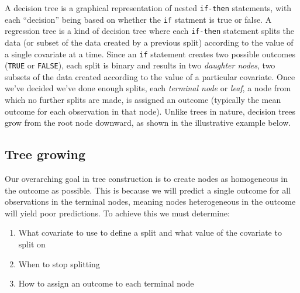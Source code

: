 \documentclass[12pt]{article}
\begin{document}
A decision tree is a graphical representation of nested \texttt{if-then} statements, with each ``decision'' being based on whether the \texttt{if} statment is true or false. A regression tree is a kind of decision tree where each \texttt{if-then} statement splits the data (or subset of the data created by a previous split) according to the value of a single covariate at a time. Since an \texttt{if} statement creates two possible outcomes (\texttt{TRUE} or \texttt{FALSE}), each split is binary and results in two \emph{daughter nodes}, two subsets of the data created according to the value of a particular covariate. Once we've decided we've done enough splits, each \emph{terminal node} or \emph{leaf}, a node from which no further splits are made, is assigned an outcome (typically the mean outcome for each observation in that node). Unlike trees in nature, decision trees grow from the root node downward, as shown in the illustrative example below.


\subsection{Tree growing} %
\label{sub:tree_growing}

Our overarching goal in tree construction is to create nodes as homogeneous in the outcome as possible. This is because we will predict a single outcome for all observations in the terminal nodes, meaning nodes heterogeneous in the outcome will yield poor predictions. To achieve this we must determine:

\begin{enumerate}
  \item What covariate to use to define a split and what value of the covariate to split on
  \item When to stop splitting
  \item How to assign an outcome to each terminal node
\end{enumerate}
\end{document}
